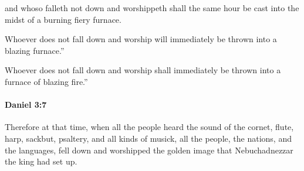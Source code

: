 			\begin{versebox}
					\item[BHS] 
					\item[LXX] 
					\item[ASV] and whoso falleth not down and worshippeth shall the same hour be cast into the midst of a burning fiery furnace.
					\item[NIV] Whoever does not fall down and worship will immediately be thrown into a blazing furnace.”
					\item[NRSV] Whoever does not fall down and worship shall immediately be thrown into a furnace of blazing fire.”
			\end{versebox}

		\paragraph{Daniel 3:7} %
			\label{DANIEL-3-7}

			Therefore at that time, when all the people heard the sound of the cornet, flute, harp, sackbut, psaltery, and all kinds of musick, all the people, the nations, and the languages, fell down and worshipped the golden image that Nebuchadnezzar the king had set up.

